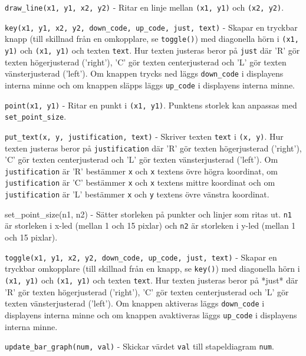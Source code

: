 \texttt{draw\_line(x1, y1, x2, y2)} - Ritar en linje mellan \texttt{(x1, y1)} och
\texttt{(x2, y2)}.

\texttt{key(x1, y1, x2, y2, down\_code, up\_code, just, text)} - Skapar en
tryckbar knapp (till skillnad från en omkopplare, se \texttt{toggle()}) med
diagonella hörn i \texttt{(x1, y1)} och \texttt{(x1, y1)} och texten \texttt{text}. Hur
texten justeras beror på \texttt{just} där 'R' gör texten högerjusterad ('right'), 'C'
gör texten centerjusterad och 'L' gör texten vänsterjusterad ('left'). Om
knappen trycks ned läggs \texttt{down\_code} i displayens interna minne och om knappen
släpps läggs \texttt{up\_code} i displayens interna minne.

\texttt{point(x1, y1)} - Ritar en punkt i \texttt{(x1, y1)}. Punktens storlek kan
anpassas med \texttt{set\_point\_size}.

\texttt{put\_text(x, y, justification, text)} - Skriver texten \texttt{text} i
\texttt{(x, y)}. Hur texten justeras beror på \texttt{justification} där 'R' gör
texten högerjusterad ('right'), 'C' gör texten centerjusterad och 'L' gör texten
vänsterjusterad ('left'). Om \texttt{justification} är 'R' bestämmer \texttt{x}
och \texttt{x} textens övre högra koordinat, om \texttt{justification} är 'C'
bestämmer \texttt{x} och \texttt{x} textens mittre koordinat och om
\texttt{justification} är 'L' bestämmer \texttt{x} och \texttt{y} textens övre
vänstra koordinat.

set\_point\_size(n1, n2) - Sätter storleken på punkter och linjer som ritas ut.
\texttt{n1} är storleken i x-led (mellan 1 och 15 pixlar) och \texttt{n2} är
storleken i y-led (mellan 1 och 15 pixlar).

\texttt{toggle(x1, y1, x2, y2, down\_code, up\_code, just, text)} - Skapar en
tryckbar omkopplare (till skillnad från en knapp, se \texttt{key()}) med
diagonella hörn i \texttt{(x1, y1)} och \texttt{(x1, y1)} och texten
\texttt{text}. Hur texten justeras beror på *just* där 'R' gör texten
högerjusterad ('right'), 'C' gör texten centerjusterad och 'L' gör texten
vänsterjusterad ('left'). Om knappen aktiveras läggs \texttt{down\_code} i
displayens interna minne och om knappen avaktiveras läggs \texttt{up\_code} i
displayens interna minne.

\texttt{update\_bar\_graph(num, val)} - Skickar värdet \texttt{val} till
stapeldiagram \texttt{num}.
